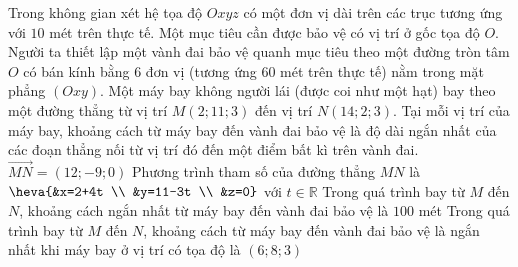 \begin{ex}%
	Trong không gian xét hệ tọa độ $Oxyz$ có một đơn vị dài trên các trục tương ứng với $10$ mét trên thực tế. Một mục tiêu cần được bảo vệ có vị trí ở gốc tọa độ $O$. Người ta thiết lập một vành đai bảo vệ quanh mục tiêu theo một đường tròn tâm $O$ có bán kính bằng $6$ đơn vị (tương ứng $60$ mét trên thực tế) nằm trong mặt phẳng $(Oxy)$. Một máy bay không người lái (được coi như một hạt) bay theo một đường thẳng từ vị trí $M(2; 11; 3)$ đến vị trí $N(14; 2; 3)$. Tại mỗi vị trí của máy bay, khoảng cách từ máy bay đến vành đai bảo vệ là độ dài ngắn nhất của các đoạn thẳng nối từ vị trí đó đến một điểm bất kì trên vành đai.
	\choiceTF
		{\True $\overrightarrow{MN}=(12;-9; 0)$}
		{Phương trình tham số của đường thẳng $MN$ là $\heva{&x=2+4t \\ &y=11-3t \\ &z=0}$ với $t \in \mathbb{R}$}
		{Trong quá trình bay từ $M$ đến $N$, khoảng cách ngắn nhất từ máy bay đến vành đai bảo vệ là $100$ mét}
		{\True Trong quá trình bay từ $M$ đến $N$, khoảng cách từ máy bay đến vành đai bảo vệ là ngắn nhất khi máy bay ở vị trí có tọa độ là $(6; 8; 3)$}
\end{ex}
